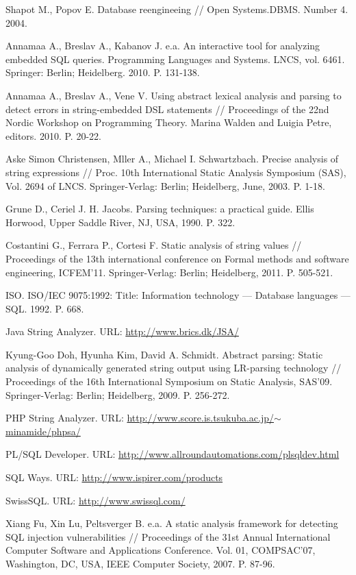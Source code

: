 \documentclass[conference]{IEEEtran}
\begin{document}
\begin{thebibliography}{1}

Shapot M., Popov E. Database reengineeing // Open Systems.DBMS. Number 4. 2004.    

Annamaa A., Breslav A., Kabanov J. e.a. An interactive tool for analyzing embedded SQL queries. Programming Languages and Systems. LNCS, vol. 6461. Springer: Berlin; Heidelberg. 2010. P. 131-138.

Annamaa A., Breslav A., Vene V. Using abstract lexical analysis and parsing to detect errors in string-embedded DSL statements // Proceedings of the 22nd Nordic Workshop on Programming Theory. Marina Walden and Luigia Petre, editors. 2010. P. 20-22.

Aske Simon Christensen, Mller A., Michael I. Schwartzbach. Precise analysis of string expressions // Proc. 10th International Static Analysis Symposium (SAS), Vol. 2694 of LNCS. Springer-Verlag: Berlin; Heidelberg, June, 2003. P. 1-18.

Grune D., Ceriel J. H. Jacobs. Parsing techniques: a practical guide. Ellis Horwood, Upper Saddle River, NJ, USA, 1990. P. 322.

Costantini G., Ferrara P., Cortesi F. Static analysis of string values // Proceedings of the 13th international conference on Formal methods and software engineering, ICFEM’11. Springer-Verlag: Berlin; Heidelberg, 2011. P. 505-521.

ISO. ISO/IEC 9075:1992: Title: Information technology — Database languages — SQL. 1992. P. 668.

Java String Analyzer. URL: \href{http://www.brics.dk/JSA/}{http://www.brics.dk/JSA/}

Kyung-Goo Doh, Hyunha Kim, David A. Schmidt. Abstract parsing: Static analysis of dynamically generated string output using LR-parsing technology // Proceedings of the 16th International Symposium on Static Analysis, SAS’09. Springer-Verlag: Berlin; Heidelberg, 2009. P. 256-272.

PHP String Analyzer. URL: \href{http://www.score.is.tsukuba.ac.jp/~minamide/phpsa/}{http://www.score.is.tsukuba.ac.jp/$\sim$minamide/phpsa/}

PL/SQL Developer. URL: \href{http://www.allroundautomations.com/plsqldev.html}{http://www.allroundautomations.com/plsqldev.html}

SQL Ways. URL: \href{http://www.ispirer.com/products}{http://www.ispirer.com/products}

SwissSQL. URL: \href{http://www.swissql.com/}{http://www.swissql.com/}

Xiang Fu, Xin Lu, Peltsverger B. e.a. A static analysis framework for detecting SQL injection vulnerabilities // Proceedings of the 31st Annual International Computer Software and Applications Conference. Vol. 01, COMPSAC’07, Washington, DC, USA, IEEE Computer Society, 2007. P. 87-96.

\end{thebibliography}
\balance
\end{document}
